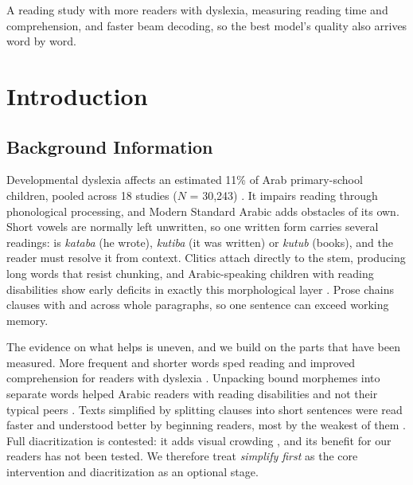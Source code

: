 \documentclass[10pt,a4paper]{article}
\begin{document}
 A reading study with more readers with dyslexia, measuring
reading time and comprehension, and faster beam decoding, so the best model's
quality also arrives word by word.

\clearpage
\section{Introduction}

\subsection{Background Information}
\label{sec:background}

Developmental dyslexia affects an estimated 11\% of Arab primary-school children,
pooled across 18 studies ($N$ = 30,243) \cite{aldakhil}. It impairs reading
through phonological processing, and Modern Standard Arabic adds obstacles of its
own. Short vowels are normally left unwritten, so one written form carries
several readings:  is \emph{kataba} (he wrote), \emph{kutiba} (it was
written) or \emph{kutub} (books), and the reader must resolve it from context.
Clitics attach directly to the stem, producing long words that resist chunking,
and Arabic-speaking children with reading disabilities show early deficits in
exactly this morphological layer \cite{saieghtaha}. Prose chains clauses with
 and  across whole paragraphs, so one sentence can exceed working
memory.

The evidence on what helps is uneven, and we build on the parts that have been
measured. More frequent and shorter words sped reading and improved
comprehension for readers with dyslexia \cite{rello2013,rivero2021}. Unpacking
bound morphemes into separate words helped Arabic readers with reading
disabilities and not their typical peers \cite{asadi2024}. Texts simplified by
splitting clauses into short sentences were read faster and understood better by
beginning readers, most by the weakest of them \cite{javourey2022}. Full
diacritization is contested: it adds visual crowding \cite{hermena2015}, and its
benefit for our readers has not been tested. We therefore treat \emph{simplify
first} as the core intervention and diacritization as an optional stage.
\end{document}

